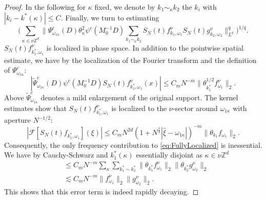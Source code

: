 \documentclass{amsart}
\numberwithin{equation}{section}
\theoremstyle{definition}
\newcommand{\Z}{\mathbb{Z}}
\begin{document}
\begin{proof}
In the following for $\kappa$ fixed, we denote by $k_1 \sim_{\kappa} k_2$ the $k_i$ with $|k_i-k^*(\kappa)| \leq C$. Finally, we turn to estimating
\begin{equation}
\label{eq:FullyLocalized}
    \big( \sum_{\kappa \in \nu \Z^d} \| \Psi^c_{\omega_{1\kappa}}(D) \theta_{\kappa}^2 \psi^c(M_0^{-1}D) \sum_{k_1 \sim_{\kappa} k_2} S_N(t) f_{k_1,\omega_1}^{\nu} S_N(t) g_{k_2,\omega_2}^{\nu} \|_{L^q}^q \big)^{1/q}.
\end{equation}
$S_N(t) f_{k_1^*,\omega_1}^{\nu}$ is localized in phase space. In addition to the pointwise spatial estimate, we have by the localization of the Fourier transform and the definition of $\Psi^c_{\omega_{1 \kappa}}$:
\begin{equation*}
|\tilde{\Psi}^c_{\omega_{1 \kappa}}(D) \psi^c(M_0^{-1} D) S_N(t) f_{k_1^*,\omega_1}^{\nu}(x)| \leq C_m N^{-m} \| \theta_{k_1^*}^{1/2} f^{\nu}_{\omega_1} \|_2.
\end{equation*}
Above $\tilde{\Psi}^c_{\omega_{1 \kappa}}$ denotes a mild enlargement of the original support. The kernel estimates show that $S_N(t) f_{k_1^*,\omega_1}^{\nu}$ is localized to the $\nu$-sector around $\omega_{1 \kappa}$ with aperture $N^{-1/2}$:
\begin{equation*}
    | \mathcal{F}[S_N(t) f_{k_1^*,\omega_1}](\xi)| \leq C_m N^{2d} (1 + N^{\frac{1}{2}} |\hat{\xi} - \omega_{1 \kappa}|)^{-m} \| \theta_{k_1} f_{\omega_1} \|_2.
\end{equation*}
Consequently, the only frequency contribution to \eqref{eq:FullyLocalized} is inessential.
We have by Cauchy-Schwarz and $k_1^*(\kappa)$ essentially disjoint as $\kappa \in \nu \Z^d$
\begin{equation*}
\begin{split}
    &\leq C_m N^{-m} \sum_{\kappa} \sum_{k_1^* \sim k_2^*} \| \theta_{k_1^*} f_{\omega_1}^{\nu} \|_2 \| \theta_{k_2^*} g_{\omega_2}^{\nu} \|_2 \\
    &\lesssim C_m N^{-m} \| f_{\omega_1}^{\nu} \|_2 \| g_{\omega_2}^{\nu} \|_2.
\end{split}
\end{equation*}
This shows that this error term is indeed rapidly decaying.


\end{proof}
\end{document}
